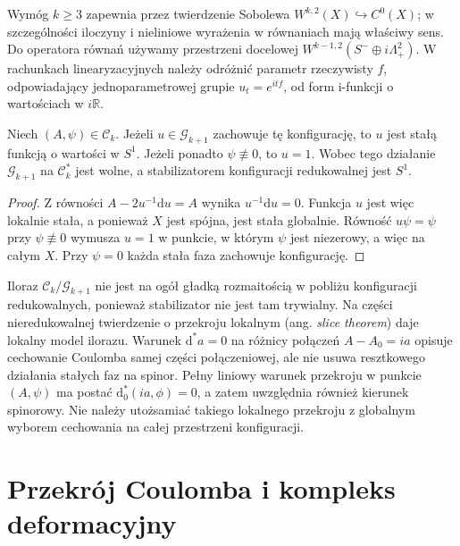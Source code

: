 Wymóg $k\geq3$ zapewnia przez twierdzenie Sobolewa
$W^{k,2}(X)\hookrightarrow C^0(X)$; w szczególności
iloczyny i nieliniowe wyrażenia w równaniach mają właściwy sens.
Do operatora równań używamy przestrzeni docelowej
$W^{k-1,2}(S^-\oplus i\Lambda^2_+)$. W rachunkach
linearyzacyjnych należy odróżnić parametr rzeczywisty $f$,
odpowiadający jednoparametrowej grupie $u_t=e^{itf}$, od form
i-funkcji o wartościach w $i\mathbb R$.

\begin{stwierdzenie}
\label{prop:tg-sw-stabilizer}
Niech $(A,\psi)\in\mathcal C_k$. Jeżeli $u\in\mathcal G_{k+1}$
zachowuje tę konfigurację, to $u$ jest stałą funkcją o wartości
w $S^1$. Jeżeli ponadto $\psi\not\equiv0$, to $u=1$.
Wobec tego działanie $\mathcal G_{k+1}$ na $\mathcal C_k^*$
jest wolne, a stabilizatorem konfiguracji redukowalnej jest $S^1$.
\end{stwierdzenie}

\begin{proof}
Z równości $A-2u^{-1}\mathrm du=A$ wynika
$u^{-1}\mathrm du=0$. Funkcja $u$ jest więc lokalnie stała,
a ponieważ $X$ jest spójna, jest stała globalnie.
Równość $u\psi=\psi$ przy $\psi\not\equiv0$ wymusza
$u=1$ w punkcie, w którym $\psi$ jest niezerowy,
a więc na całym $X$. Przy $\psi=0$ każda stała faza
zachowuje konfigurację.
\end{proof}

\begin{uwaga}
Iloraz $\mathcal C_k/\mathcal G_{k+1}$ nie jest na ogół gładką
rozmaitością w pobliżu konfiguracji redukowalnych, ponieważ
stabilizator nie jest tam trywialny. Na części nieredukowalnej
twierdzenie o przekroju lokalnym (ang. \emph{slice theorem})
daje lokalny model ilorazu. Warunek $\mathrm d^*a=0$
na różnicy połączeń $A-A_0=ia$ opisuje cechowanie Coulomba
samej części połączeniowej, ale nie usuwa resztkowego działania
stałych faz na spinor. Pełny liniowy warunek przekroju
w punkcie $(A,\psi)$ ma postać $\mathrm d_0^*(ia,\phi)=0$,
a zatem uwzględnia również kierunek spinorowy.
Nie należy utożsamiać takiego lokalnego przekroju
z globalnym wyborem cechowania na całej przestrzeni konfiguracji.
\end{uwaga}

\section{Przekrój Coulomba i kompleks deformacyjny}
\label{sec:tg-sw-deform}

